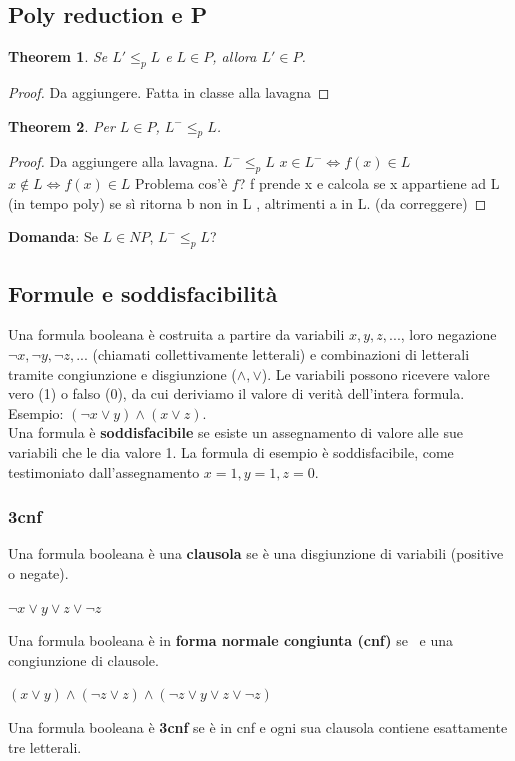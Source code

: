 \documentclass[a4paper, 12pt]{article}
\newtheorem{theorem}{Theorem}[section]
\begin{document}
\subsection{Poly reduction e P}
\begin{theorem}
Se $L' \leq_p L$ e $L \in P$, allora $L' \in P$.
\end{theorem}
\begin{proof}
Da aggiungere. Fatta in classe alla lavagna
\end{proof}
\begin{theorem}
Per $L \in P$, $L^{-} \leq_p L$. 
\end{theorem}
\begin{proof}
Da aggiungere alla lavagna.
$L^{-} \leq_p L$
$x \in L^{-} \iff f(x) \in L$
$x \notin L \iff f(x) \in L$
Problema cos'\`e $f$?
f prende x e calcola se x appartiene ad L (in tempo poly) se s\`i ritorna b non in L , altrimenti a in L. (da correggere)
\end{proof}
\textbf{Domanda}: Se $L \in NP$, $L^{-} \leq_p L$?
\subsection{Formule e soddisfacibilit\`a}
Una formula booleana \`e costruita a partire da variabili $x,y,z,...$, loro negazione $\lnot x, \lnot y, \lnot z,...$ (chiamati collettivamente letterali) e combinazioni di letterali tramite congiunzione e disgiunzione ($\land, \lor $). Le variabili possono ricevere valore vero (1) o falso (0), da cui deriviamo il valore di verit\`a dell'intera formula.\\
Esempio: $(\lnot x \lor y) \land (x \lor z)$.\\
Una formula \`e \textbf{soddisfacibile} se esiste un assegnamento di valore alle sue variabili che le dia valore 1. La formula di esempio \`e soddisfacibile, come testimoniato dall'assegnamento $x=1,y=1,z=0$.
\subsubsection{3cnf}
Una formula booleana \`e una \textbf{clausola} se \`e una disgiunzione di variabili (positive o negate).
\begin{center}
$\lnot x \lor y \lor z \lor \lnot z$
\end{center}
Una formula booleana \`e in \textbf{forma normale congiunta (cnf)} se \	e una congiunzione di clausole.
\begin{center}
$(x \lor y) \land (\lnot z \lor z) \land (\lnot z \lor y \lor z \lor \lnot z)$
\end{center}
Una formula booleana \`e \textbf{3cnf} se \`e in cnf e ogni sua clausola contiene esattamente tre letterali.
\end{document}

